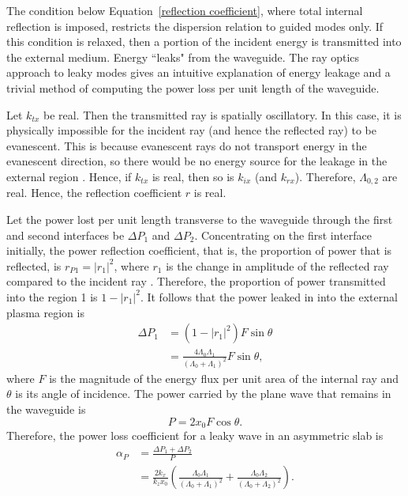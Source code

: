 \documentclass[12pt]{../style-files/ociamthesis}
\begin{document}
	The condition below Equation~\eqref{reflection coefficient}, where total internal reflection is imposed, restricts the dispersion relation to guided modes only. If this condition is relaxed, then a portion of the incident energy is transmitted into the external medium. Energy ``leaks" from the waveguide. The ray optics approach to leaky modes gives an intuitive explanation of energy leakage and a trivial method of computing the power loss per unit length of the waveguide.
	
	Let $k_{tx}$ be real. Then the transmitted ray is spatially oscillatory. In this case, it is physically impossible for the incident ray (and hence the reflected ray) to be evanescent. This is because evanescent rays do not transport energy in the evanescent direction, so there would be no energy source for the leakage in the external region \citep{goe_etal04}. Hence, if $k_{tx}$ is real, then so is $k_{ix}$ (and $k_{rx}$). Therefore, $\Lambda_{0, 2}$ are real. Hence, the reflection coefficient $r$ is real.
	
	Let the power lost per unit length transverse to the waveguide through the first and second interfaces be $\Delta P_1$ and $\Delta P_2$. Concentrating on the first interface initially, the power reflection coefficient, that is, the proportion of power that is reflected, is $r_{P1} = |r_1|^2$, where $r_1$ is the change in amplitude of the reflected ray compared to the incident ray \citep{mar74}. Therefore, the proportion of power transmitted into the region 1 is $1 - |r_1|^2$. It follows that the power leaked in into the external plasma region is
	\begin{align}
	\Delta P_1 &= (1 - |r_1|^2)F\sin{\theta} \\
	&= \frac{4\Lambda_0\Lambda_1}{(\Lambda_0 + \Lambda_1)^2}F\sin{\theta},
	\end{align}
	where $F$ is the magnitude of the energy flux per unit area of the internal ray and $\theta$ is its angle of incidence. The power carried by the plane wave that remains in the waveguide is
	\begin{equation}
	P = 2x_0F\cos{\theta}.
	\end{equation}
	Therefore, the power loss coefficient for a leaky wave in an asymmetric slab is
	\begin{align}
	\alpha_P &= \frac{\Delta P_1 + \Delta P_2}{P} \\
	&= \frac{2k_x}{k_zx_0}\left( \frac{\Lambda_0\Lambda_1}{(\Lambda_0 + \Lambda_1)^2} + \frac{\Lambda_0\Lambda_2}{(\Lambda_0 + \Lambda_2)^2} \right).
	\end{align}
	
\end{document}
